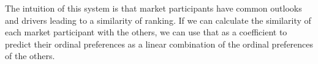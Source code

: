 The intuition of this system is that market participants have common outlooks and drivers leading to a similarity of ranking. If we can calculate the similarity of each market participant with the others, we can use that as a coefficient to predict their ordinal preferences as a linear combination of the ordinal preferences of the others. 